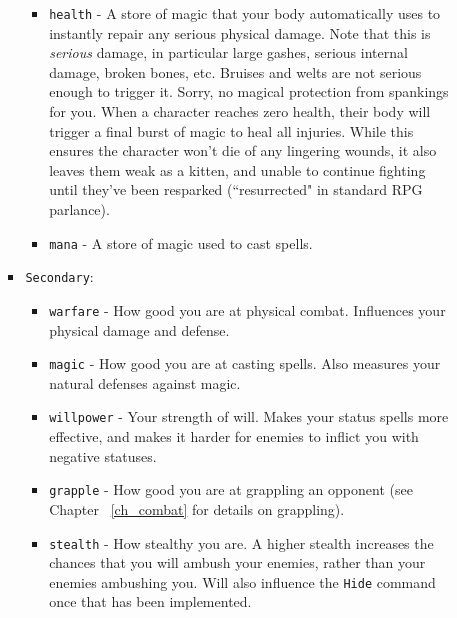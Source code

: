 \documentclass{report}
\begin{document}
\begin{itemize}
\begin{itemize}
\begin{itemize}
\begin{itemize}
                \item \verb|health| - A store of magic that your body automatically uses to
                instantly repair any serious physical damage. Note that this is \emph{serious}
                damage, in particular large gashes, serious internal damage, broken bones,
                etc. Bruises and welts are not serious enough to trigger it. Sorry, no 
                magical protection from spankings for you. When a character reaches zero health,
                their body will trigger a final burst of magic to heal all injuries. While this ensures
                the character won't die of any lingering wounds, it also leaves them weak as a kitten, and unable to continue fighting until they've been resparked 
                (``resurrected" in standard RPG parlance).
                \item \verb|mana| - A store of magic used to cast spells.
            \end{itemize}
        \item \verb|Secondary|:
            \begin{itemize}
                \item \verb|warfare| - How good you are at physical combat. Influences your
                physical damage and defense.
                \item \verb|magic| - How good you are at casting spells. Also measures your
                natural defenses against magic.
                \item \verb|willpower| - Your strength of will. Makes your status spells more
                effective, and makes it harder for enemies to inflict you with negative 
                statuses.
                \item \verb|grapple| - How good you are at grappling an opponent (see Chapter
                ~\ref{ch_combat} for details on grappling).
                \item \verb|stealth| - How stealthy you are. A higher stealth increases the 
                chances that you will ambush your enemies, rather than your enemies ambushing
                you. Will also influence the \verb|Hide| command once that has been implemented.
    \end{itemize}
\end{itemize}


\end{itemize}
\end{itemize}
\end{document}
